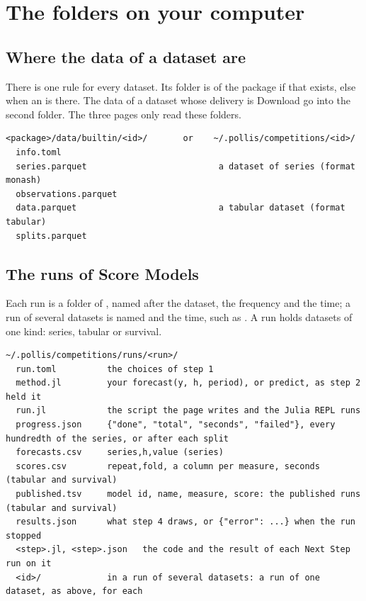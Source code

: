 \section{The folders on your computer}
\label{sec:folders}

\subsection{Where the data of a dataset are}

There is one rule for every dataset. Its folder is  of the package if that exists, else
 when an  is there. The data of a dataset whose delivery is Download go
into the second folder. The three pages only read these folders.

\begin{lstlisting}
<package>/data/builtin/<id>/       or    ~/.pollis/competitions/<id>/
  info.toml
  series.parquet                          a dataset of series (format monash)
  observations.parquet
  data.parquet                            a tabular dataset (format tabular)
  splits.parquet
\end{lstlisting}

\subsection{The runs of Score Models}

Each run is a folder of , named after the dataset, the frequency and the time; a run of several datasets is named
 and the time, such as . A run holds datasets of one kind: series,
tabular or survival.

\begin{lstlisting}
~/.pollis/competitions/runs/<run>/
  run.toml          the choices of step 1
  method.jl         your forecast(y, h, period), or predict, as step 2 held it
  run.jl            the script the page writes and the Julia REPL runs
  progress.json     {"done", "total", "seconds", "failed"}, every hundredth of the series, or after each split
  forecasts.csv     series,h,value (series)
  scores.csv        repeat,fold, a column per measure, seconds (tabular and survival)
  published.tsv     model id, name, measure, score: the published runs (tabular and survival)
  results.json      what step 4 draws, or {"error": ...} when the run stopped
  <step>.jl, <step>.json   the code and the result of each Next Step run on it
  <id>/             in a run of several datasets: a run of one dataset, as above, for each
\end{lstlisting}

